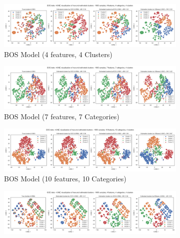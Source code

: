 \begin{figure}[H]
    \centering
    \begin{subfigure}[b]{0.49\textwidth}
        \includegraphics[width=\textwidth]{python_figures/tsne_bos_n1000_d4_m4_k4.png}
        \caption{BOS Model (4 features, 4 Clusters)}
        \label{fig:tsne_bos_4d}
    \end{subfigure}
    \hfill
    \begin{subfigure}[b]{0.49\textwidth}
        \includegraphics[width=\textwidth]{python_figures/tsne_bos_n1000_d7_m7_k4.png}
        \caption{BOS Model (7 features, 7 Categories)}
        \label{fig:tsne_bos_7d}
    \end{subfigure}
    \newline
    \begin{subfigure}[b]{0.49\textwidth}
        \includegraphics[width=\textwidth]{python_figures/tsne_bos_n1000_d10_m10_k4.png}
        \caption{BOS Model (10 features, 10 Categories)}
        \label{fig:tsne_bos_10d}
    \end{subfigure}
    \hfill
    \begin{subfigure}[b]{0.49\textwidth}
        \includegraphics[width=\textwidth]{python_figures/tsne_god_n1000_d4_m4_k4.png}

\end{subfigure}
\end{figure}
